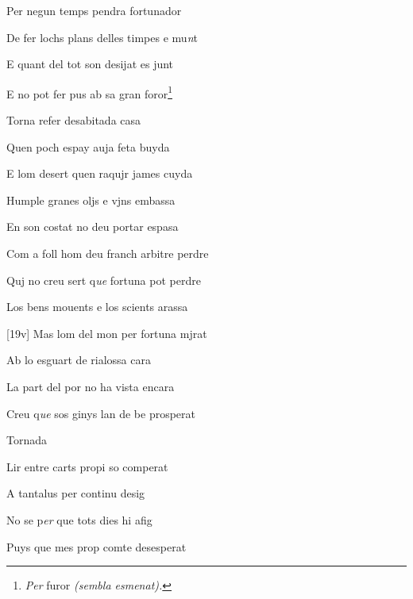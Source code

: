 \documentclass[12pt]{article}
\begin{document}
\begin{estrofa}

 Per negun temps pendra fortunador

 De fer lochs plans delles timpes e mu\textit{n}t

 E quant del tot son desijat es junt

 E no pot fer pus ab sa gran foror\footnote{\textit{Per} furor \textit{(sembla
esmenat).}}

 Torna refer desabitada casa

 Quen poch espay auja feta buyda

 E lom desert quen raqujr james cuyda

 Humple granes oljs e vjns embassa

\end{estrofa}



\begin{estrofa}

 En son costat no deu portar espasa

 Com a foll hom deu franch arbitre perdre

 Quj no creu sert q\textit{ue} fortuna pot perdre

 Los bens mouents e los scients arassa

 [19v] Mas lom del mon per fortuna mjrat

 Ab lo esguart de rialossa cara

 La part del por no ha vista encara

 Creu q\textit{ue} sos ginys lan de be prosperat

\end{estrofa}


\begin{estrofaExtra}%




\begin{tornada}

Tornada

\end{tornada}


\end{estrofaExtra}


\begin{estrofa}

 Lir entre carts propi so comperat

 A tantalus per continu desig

 No se p\textit{er} que tots dies hi afig

 Puys que mes prop comte desesperat

\end{estrofa}
\end{document}
